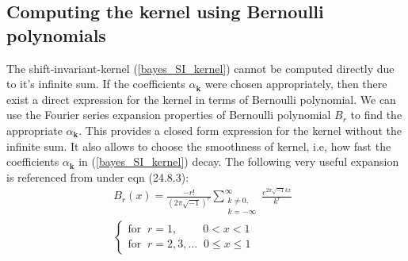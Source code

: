 \documentclass[twocolumn]{svjour3}          %
\newcommand{\bm}[1]{\boldsymbol{#1}}
\newcommand{\vk}{\bm{k}}
\begin{document}
\subsection{Computing the kernel using Bernoulli polynomials}
The shift-invariant-kernel (\ref{bayes_SI_kernel}) cannot be computed directly due to it's  infinite sum. 
If the coefficients $\alpha_{\vk}$ were chosen appropriately, then there exist a direct expression for the kernel in terms of Bernoulli polynomial. 
We can use the Fourier series expansion properties \cite{DLMF} of Bernoulli polynomial $B_r$ to find the appropriate $\alpha_{\vk}$. This provides a closed form expression for the kernel without the infinite sum. It also allows to choose the smoothness of kernel, i.e, how fast the coefficients $\alpha_{\vk}$ in (\ref{bayes_SI_kernel}) decay.
The following very useful expansion is referenced from \cite{DLMF} under eqn (24.8.3):
\begin{multline}
\label{dlmf_bernoulli_24_8_3}
B_{r}(x) = \frac{-r!}{(2 \pi \sqrt{-1})^{r}} 
\sum_{\substack{k \neq 0,\\ k=-\infty}}^\infty 
\frac{e^{2\pi\sqrt{-1} k x}}{k^{r}}
\;\;
\\
\begin{cases}
\text{for} \;\; r=1, \qquad \; 0 < x < 1 \\
\text{for} \;\; r=2,3,\hdots \;\; 0 \leq x \leq 1
\end{cases}
\end{multline}
\end{document}
